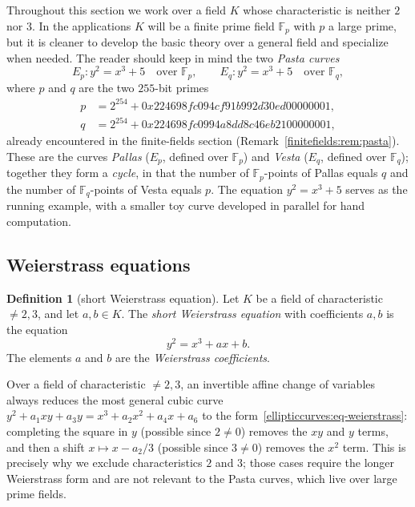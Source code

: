 \documentclass[11pt,a4paper]{article}
\theoremstyle{definition}
\newtheorem{definition}[theorem]{Definition}
\theoremstyle{remark}
\newcommand{\Fp}{\ensuremath{\mathbb{F}_{p}}}
\newcommand{\Fq}{\ensuremath{\mathbb{F}_{q}}}
\begin{document}
Throughout this section we work over a field \(K\) whose characteristic is neither \(2\) nor \(3\). In the applications \(K\) will be a finite prime field \(\Fp\) with \(p\) a large prime, but it is cleaner to develop the basic theory over a general field and specialize when needed. The reader should keep in mind the two \emph{Pasta curves}
\[
  E_p : y^2 = x^3 + 5 \quad\text{over } \Fp, \qquad
  E_q : y^2 = x^3 + 5 \quad\text{over } \Fq,
\]
where \(p\) and \(q\) are the two \(255\)-bit primes
\begin{align*}
  p &= 2^{254} + 0x224698fc094cf91b992d30ed00000001,\\
  q &= 2^{254} + 0x224698fc0994a8dd8c46eb2100000001,
\end{align*}
already encountered in the finite-fields section (Remark~\ref{finitefields:rem:pasta}). These are the curves \emph{Pallas} (\(E_p\), defined over \(\Fp\)) and \emph{Vesta} (\(E_q\), defined over \(\Fq\)); together they form a \emph{cycle}, in that the number of \(\Fp\)-points of Pallas equals \(q\) and the number of \(\Fq\)-points of Vesta equals \(p\). The equation \(y^2 = x^3 + 5\) serves as the running example, with a smaller toy curve developed in parallel for hand computation.

\subsection{Weierstrass equations}

\begin{definition}[short Weierstrass equation]\label{ellipticcurves:def-weierstrass}
Let \(K\) be a field of characteristic \(\neq 2, 3\), and let \(a, b \in K\). The \emph{short Weierstrass equation} with coefficients \(a, b\) is the equation
\begin{equation}\label{ellipticcurves:eq-weierstrass}
  y^2 = x^3 + a x + b .
\end{equation}
The elements \(a\) and \(b\) are the \emph{Weierstrass coefficients}.
\end{definition}

Over a field of characteristic \(\neq 2, 3\), an invertible affine change of variables always reduces the most general cubic curve \(y^2 + a_1 xy + a_3 y = x^3 + a_2 x^2 + a_4 x + a_6\) to the form~\eqref{ellipticcurves:eq-weierstrass}: completing the square in \(y\) (possible since \(2 \neq 0\)) removes the \(xy\) and \(y\) terms, and then a shift \(x \mapsto x - a_2/3\) (possible since \(3 \neq 0\)) removes the \(x^2\) term. This is precisely why we exclude characteristics \(2\) and \(3\); those cases require the longer Weierstrass form and are not relevant to the Pasta curves, which live over large prime fields.
\end{document}
